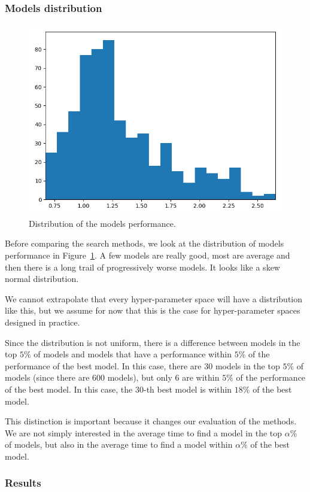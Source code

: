\subsubsection{Models distribution}

\begin{figure}[htb]
	\centering
	\includegraphics[width=0.7\linewidth]{img_hyperopt/cifar_hist.png}
	\caption{Distribution of the models performance.}
	\label{fig:cifar_hist}
\end{figure}

Before comparing the search methods, we look at the distribution of models performance in Figure~\ref{fig:cifar_hist}. A few models are really good, most are average and then there is a long trail of progressively worse models. It looks like a skew normal distribution. 

We cannot extrapolate that every hyper-parameter space will have a distribution like this, but we assume for now that this is the case for hyper-parameter spaces designed in practice.

Since the distribution is not uniform, there is a difference between models in the top $5 \%$ of models and models that have a performance within $5 \%$ of the performance of the best model. In this case, there are 30 models in the top $5 \%$ of models (since there are 600 models), but only 6 are within $5 \%$ of the performance of the best model. In this case, the 30-th best model is within $18 \%$ of the best model.

This distinction is important because it changes our evaluation of the methods. We are not simply interested in the average time to find a model in the top $\alpha \%$ of models, but also in the average time to find a model within $\alpha \%$ of the best model.

\subsubsection{Results}


